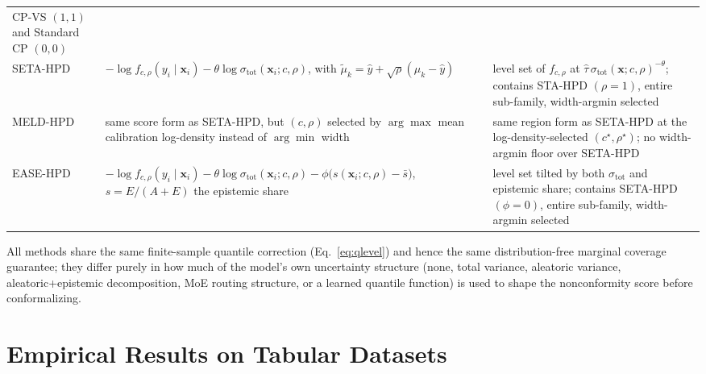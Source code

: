\documentclass[11pt]{article}
\begin{document}
\begin{center}
\begin{tabular}{@{}p{4.1cm}p{5.3cm}p{5.3cm}@{}}
CP-VS $(1,1)$ and Standard CP $(0,0)$ \\
SETA-HPD & $-\log f_{c,\rho}(y_i\mid\bm{x}_i) - \theta\log\sigma_{\mathrm{tot}}(\bm{x}_i;c,\rho)$,
with $\tilde\mu_k=\hat y+\sqrt\rho(\mu_k-\hat y)$ & level set of $f_{c,\rho}$ at
$\hat\tau\,\sigma_{\mathrm{tot}}(\bm{x};c,\rho)^{-\theta}$; contains STA-HPD $(\rho{=}1)$, entire
sub-family, width-argmin selected \\
MELD-HPD & same score form as SETA-HPD, but $(c,\rho)$ selected by $\arg\max$ mean calibration
log-density instead of $\arg\min$ width & same region form as SETA-HPD at the log-density-selected
$(c^\star,\rho^\star)$; no width-argmin floor over SETA-HPD \\
EASE-HPD & $-\log f_{c,\rho}(y_i\mid\bm{x}_i) - \theta\log\sigma_{\mathrm{tot}}(\bm{x}_i;c,\rho) -
\phi\big(s(\bm{x}_i;c,\rho)-\bar s\big)$, $s=E/(A{+}E)$ the epistemic share & level set tilted by
both $\sigma_{\mathrm{tot}}$ and epistemic share; contains SETA-HPD $(\phi{=}0)$, entire
sub-family, width-argmin selected \\
\bottomrule
\end{tabular}
\end{center}

All methods share the same finite-sample quantile correction (Eq.~\ref{eq:qlevel}) and hence the
same distribution-free marginal coverage guarantee; they differ purely in how much of the model's
own uncertainty structure (none, total variance, aleatoric variance, aleatoric+epistemic
decomposition, MoE routing structure, or a learned quantile function) is used to shape the
nonconformity score before conformalizing.

\section{Empirical Results on Tabular Datasets}
\label{sec:results}
\end{document}

